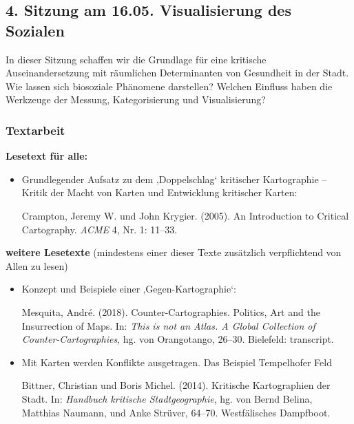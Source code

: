 \documentclass[
  ngerman,
]{article}
\begin{document}
\hypertarget{sitzung-am-16.05.-visualisierung-des-sozialen}{%
\subsection*{4. Sitzung am 16.05. \textbar{} Visualisierung des Sozialen}\label{sitzung-am-16.05.-visualisierung-des-sozialen}}

In dieser Sitzung schaffen wir die Grundlage für eine kritische Auseinandersetzung mit räumlichen Determinanten von Gesundheit in der Stadt. Wie lassen sich biosoziale Phänomene darstellen? Welchen Einfluss haben die Werkzeuge der Messung, Kategorisierung und Visualisierung?

\hypertarget{textarbeit-3}{%
\subsubsection*{Textarbeit}\label{textarbeit-3}}

\textbf{Lesetext für alle:}

\begin{itemize}
\item
  Grundlegender Aufsatz zu dem ‚Doppelschlag` kritischer Kartographie -- Kritik der Macht von Karten und Entwicklung kritischer Karten:

  Crampton, Jeremy W. und John Krygier. (2005). An Introduction to Critical Cartography. \emph{ACME} 4, Nr. 1: 11--33.
\end{itemize}

\textbf{weitere Lesetexte}
(mindestens einer dieser Texte zusätzlich verpflichtend von Allen zu lesen)

\begin{itemize}
\item
  Konzept und Beispiele einer ‚Gegen-Kartographie`:

  Mesquita, André. (2018). Counter-Cartographies. Politics, Art and the Insurrection of Maps. In: \emph{This is not an Atlas. A Global Collection of Counter-Cartographies}, hg. von Orangotango, 26--30. Bielefeld: transcript.
\item
  Mit Karten werden Konflikte ausgetragen. Das Beispiel Tempelhofer Feld

  Bittner, Christian und Boris Michel. (2014). Kritische Kartographien der Stadt. In: \emph{Handbuch kritische Stadtgeographie}, hg. von Bernd Belina, Matthias Naumann, und Anke Strüver, 64--70. Westfälisches Dampfboot.
\end{itemize}
\end{document}

